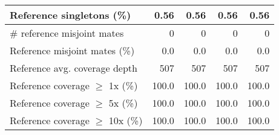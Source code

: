 \documentclass[12pt,a4paper]{article}
\begin{document}
\begin{table}[ht]
\begin{center}
\begin{tabular}{|l*{4}{|r}|}
Reference singletons (\%) & 0.56 & 0.56 & 0.56 & 0.56 \\ \hline
\# reference misjoint mates & 0 & 0 & 0 & 0 \\ \hline
Reference misjoint mates (\%) & 0.0 & 0.0 & 0.0 & 0.0 \\ \hline
Reference avg. coverage depth & 507 & 507 & 507 & 507 \\ \hline
Reference coverage $\geq$ 1x (\%) & 100.0 & 100.0 & 100.0 & 100.0 \\ \hline
Reference coverage $\geq$ 5x (\%) & 100.0 & 100.0 & 100.0 & 100.0 \\ \hline
Reference coverage $\geq$ 10x (\%) & 100.0 & 100.0 & 100.0 & 100.0 \\ \hline
\end{tabular}
\end{center}
\end{table}
\end{document}
